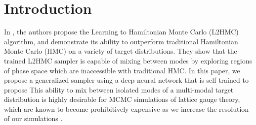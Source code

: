 \documentclass{article} %
\begin{document}
\section{\label{sec:introduction}Introduction}
In \citet{levy2017}, the authors propose the Learning to Hamiltonian Monte Carlo (L2HMC) algorithm, and demonstrate
its ability to outperform traditional Hamiltonian Monte Carlo (HMC) on a variety of %
target
distributions.
%
They show that the trained L2HMC sampler is capable of mixing between modes by exploring regions of phase space which are %
inaccessible with traditional HMC.
%
In this paper, we propose a generalized sampler using a deep neural network that is self trained to propose 
This ability to mix between isolated modes of a multi-modal target distribution is highly desirable for MCMC simulations of lattice gauge theory, which are known to become prohibitively expensive as we increase the resolution of our simulations \cite{schaefer2009investigating,cossu2018testing}.
%
\end{document}
